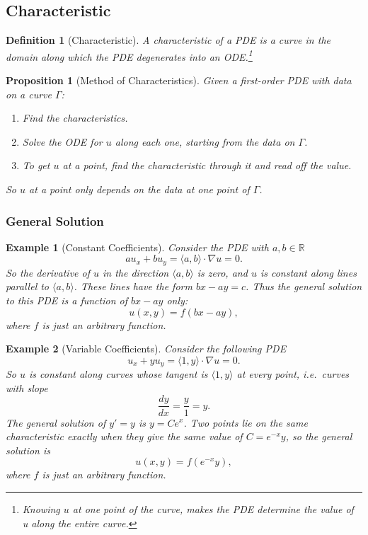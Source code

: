 \documentclass{article}
\newtheorem{definition}{Definition}
\newtheorem*{example}{Example}
\newtheorem{proposition}{Proposition}
\newcommand{\R}{\mathbb{R}}
\begin{document}
\subsection{Characteristic}
\begin{definition}[Characteristic]
    A characteristic of a PDE is a curve in the domain along which the PDE degenerates into an ODE.\footnote{Knowing $u$ at one point of the curve, makes the PDE determine the value of u along the entire curve.}
\end{definition}
\begin{proposition}[Method of Characteristics]
    Given a first-order PDE with data on a curve $\Gamma$:
    \begin{enumerate}
        \item Find the characteristics.
        \item Solve the ODE for $u$ along each one, starting from the data on $\Gamma$.
        \item To get $u$ at a point, find the characteristic through it and read off the value.
    \end{enumerate}
    So $u$ at a point only depends on the data at one point of $\Gamma$.
\end{proposition}

\subsubsection{General Solution}
\begin{example}[Constant Coefficients]
    \label{ex:constant-coeff}
    Consider the PDE with $a,b \in\R$
    \[au_x+bu_y=\langle a,b\rangle\cdot\nabla u = 0.\]
    So the derivative of $u$ in the direction $\langle a,b\rangle$ is zero, and $u$ is constant along lines parallel to $\langle a,b\rangle$. These lines have the form $bx-ay=c$. Thus the general solution to this PDE is a function of $bx-ay$ only:
    \[u(x,y) = f(bx-ay),\]
    where $f$ is just an arbitrary function.
\end{example}
\begin{example}[Variable Coefficients]
    Consider the following PDE
    \[u_x+yu_y=\langle 1,y\rangle\cdot\nabla u=0.\]
    So $u$ is constant along curves whose tangent is $\langle 1,y\rangle$ at every point, i.e.\ curves with slope
    \[\frac{dy}{dx} = \frac{y}{1} = y.\]
    The general solution of $y'=y$ is $y=Ce^x$. Two points lie on the same characteristic exactly when they give the same value of $C=e^{-x}y$, so the general solution is
    \[u(x,y) = f(e^{-x}y),\]
    where $f$ is just an arbitrary function.
\end{example}
\end{document}
